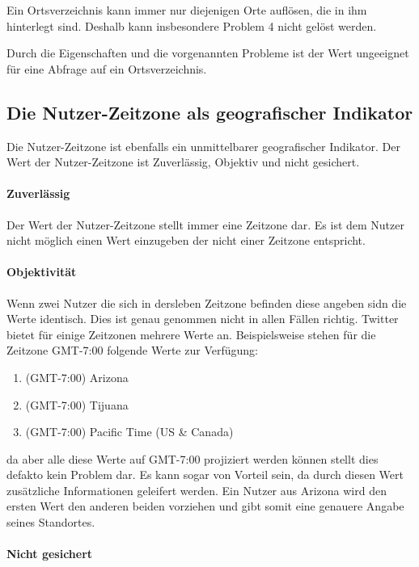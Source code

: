 				Ein Ortsverzeichnis kann immer nur diejenigen Orte auflösen, die in ihm hinterlegt sind.
				Deshalb kann insbesondere Problem 4 nicht gelöst werden.

				Durch die Eigenschaften und die vorgenannten Probleme ist der Wert ungeeignet für eine Abfrage auf ein Ortsverzeichnis.  


			\subsection{Die Nutzer-Zeitzone als geografischer Indikator}

				Die Nutzer-Zeitzone ist ebenfalls ein unmittelbarer geografischer Indikator. 
				Der Wert der Nutzer-Zeitzone ist Zuverlässig, Objektiv und nicht gesichert. 
				
				\paragraph{Zuverlässig}
					Der Wert der Nutzer-Zeitzone stellt immer eine Zeitzone dar.
					Es ist dem Nutzer nicht möglich einen Wert einzugeben der nicht einer Zeitzone entspricht.

				\paragraph{Objektivität}
					Wenn zwei Nutzer die sich in dersleben Zeitzone befinden diese angeben sidn die Werte identisch.
					Dies ist genau genommen nicht in allen Fällen richtig.
					Twitter bietet für einige Zeitzonen mehrere Werte an. 
					Beispielsweise stehen für die Zeitzone GMT-7:00 folgende Werte zur Verfügung:

					\begin{enumerate}
					  	\item (GMT-7:00) Arizona
					  	\item (GMT-7:00) Tijuana 
					  	\item (GMT-7:00) Pacific Time (US \& Canada)   
					  \end{enumerate}  

					  da aber alle diese Werte auf GMT-7:00 projiziert werden können stellt dies defakto kein Problem dar. 
					  Es kann sogar von Vorteil sein, da durch diesen Wert zusätzliche Informationen geleifert werden.
					  Ein Nutzer aus Arizona wird den ersten Wert den anderen beiden vorziehen und gibt somit eine genauere Angabe seines Standortes. 

				\paragraph{Nicht gesichert} 

